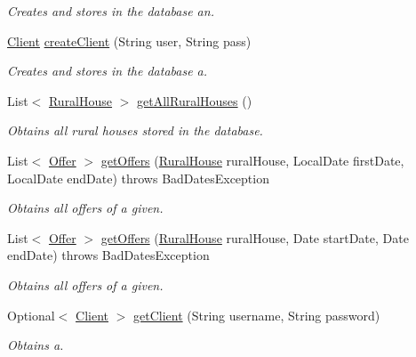 \begin{DoxyCompactItemize}
\begin{DoxyCompactList}\small\item\em Creates and stores in the database an. \end{DoxyCompactList}\item 
\mbox{\hyperlink{classcom_1_1ruralhousejsf_1_1domain_1_1_client}{Client}} \mbox{\hyperlink{classcom_1_1ruralhousejsf_1_1data_access_1_1_hibernate_data_access_ab1113c4a35f6f888d6bee15f25b117d5}{create\+Client}} (String user, String pass)
\begin{DoxyCompactList}\small\item\em Creates and stores in the database a. \end{DoxyCompactList}\item 
List$<$ \mbox{\hyperlink{classcom_1_1ruralhousejsf_1_1domain_1_1_rural_house}{Rural\+House}} $>$ \mbox{\hyperlink{classcom_1_1ruralhousejsf_1_1data_access_1_1_hibernate_data_access_acb92be47dc680218ff3102addce8ae8f}{get\+All\+Rural\+Houses}} ()
\begin{DoxyCompactList}\small\item\em Obtains all rural houses stored in the database. \end{DoxyCompactList}\item 
List$<$ \mbox{\hyperlink{classcom_1_1ruralhousejsf_1_1domain_1_1_offer}{Offer}} $>$ \mbox{\hyperlink{classcom_1_1ruralhousejsf_1_1data_access_1_1_hibernate_data_access_a54bd9542b20644ccd47961ca260d17b4}{get\+Offers}} (\mbox{\hyperlink{classcom_1_1ruralhousejsf_1_1domain_1_1_rural_house}{Rural\+House}} rural\+House, Local\+Date first\+Date, Local\+Date end\+Date)  throws Bad\+Dates\+Exception 
\begin{DoxyCompactList}\small\item\em Obtains all offers of a given. \end{DoxyCompactList}\item 
List$<$ \mbox{\hyperlink{classcom_1_1ruralhousejsf_1_1domain_1_1_offer}{Offer}} $>$ \mbox{\hyperlink{classcom_1_1ruralhousejsf_1_1data_access_1_1_hibernate_data_access_ad428053d12fae95599312c13951f9c87}{get\+Offers}} (\mbox{\hyperlink{classcom_1_1ruralhousejsf_1_1domain_1_1_rural_house}{Rural\+House}} rural\+House, Date start\+Date, Date end\+Date)  throws Bad\+Dates\+Exception 
\begin{DoxyCompactList}\small\item\em Obtains all offers of a given. \end{DoxyCompactList}\item 
Optional$<$ \mbox{\hyperlink{classcom_1_1ruralhousejsf_1_1domain_1_1_client}{Client}} $>$ \mbox{\hyperlink{classcom_1_1ruralhousejsf_1_1data_access_1_1_hibernate_data_access_a6df6a0502595b73be0f6d238743eeda5}{get\+Client}} (String username, String password)
\begin{DoxyCompactList}\small\item\em Obtains a. \end{DoxyCompactList}\end{DoxyCompactItemize}
